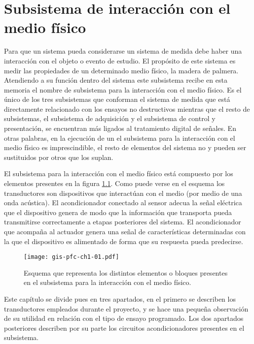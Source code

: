 \chapter{Subsistema de interacción con el medio físico}

Para que un sistema pueda considerarse un sistema de medida debe haber una
interacción con el objeto o evento de estudio. El propósito de este sistema
es medir las propiedades de un determinado medio físico, la madera de
palmera. Atendiendo a su función dentro del sistema este subsistema recibe
en esta memoria el nombre de subsistema para la interacción con el medio
físico. Es el único de los tres subsistemas que conforman el sistema de
medida que está directamente relacionado con los ensayos no destructivos
mientras que el resto de subsistemas, el subsistema de adquisición y el
subsistema de control y presentación, se encuentran más ligados al
tratamiento digital de señales. En otras palabras, en la ejecución de un
 el subsistema para la interacción con el medio físico es
imprescindible, el resto de elementos del sistema no y pueden ser
sustituidos por otros que los suplan.

El subsistema para la interacción con el medio físico está compuesto por
los elementos presentes en la figura \cref{fig:submedium}. Como puede verse
en el esquema los transductores son dispositivos que interactúan con el
medio (por medio de una onda acústica). El acondicionador conectado al
sensor adecua la señal eléctrica que el dispositivo genera de modo que la
información que transporta pueda transmitirse correctamente a etapas
posteriores del sistema. El acondicionador que acompaña al actuador genera
una señal de características determinadas con la que el dispositivo es
alimentado de forma que su respuesta pueda predecirse.

\begin{figure}
	\begin{center}
		\texttt{[image: gis-pfc-ch1-01.pdf]}
	\end{center}
	\caption[Subsistema para la interacción del medio físico]{Esquema
	que representa los distintos elementos o bloques presentes en el
	subsistema para la interacción con el medio físico.}
	\label{fig:submedium}
\end{figure}

Este capítulo se divide pues en tres apartados, en el primero se describen
los transductores empleados durante el proyecto, y se hace una pequeña
observación de su utilidad en relación con el tipo de ensayo
programado. Los dos apartados posteriores describen por su parte los
circuitos acondicionadores presentes en el subsistema.

